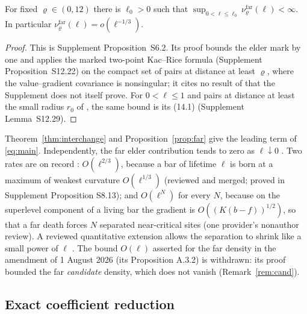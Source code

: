 \begin{proposition}\label{prop:far}
For fixed $\varrho\in(0,12)$ there is $\ell_0>0$ such that $\sup_{0<\ell\le\ell_0}\nu^{\mathrm{far}}_\varrho(\ell)<\infty$. In particular $\nu^{\mathrm{far}}_\varrho(\ell)=o(\ell^{-1/3})$.
\end{proposition}

\begin{proof}
This is Supplement Proposition~S6.2. Its proof bounds the elder mark by one and applies the marked two-point Kac--Rice formula (Supplement Proposition~S12.22) on the compact set of pairs at distance at least $\varrho$, where the value--gradient covariance is nonsingular; it cites no result of  that the Supplement does not itself prove. For $0<\ell\le1$ and pairs at distance at least the small radius $r_0$ of , the same bound is its (14.1) (Supplement Lemma~S12.29).
\end{proof}

Theorem~\ref{thm:interchange} and Proposition~\ref{prop:far} give the leading term of \eqref{eq:main}. Independently, the far elder contribution tends to zero as $\ell\downarrow0$ . Two rates are on record : $O(\ell^{2/3})$, because a bar of lifetime $\ell$ is born at a maximum of weakest curvature $O(\ell^{1/3})$ (reviewed and merged; proved in Supplement Proposition S8.13); and $O(\ell^N)$ for every $N$, because on the superlevel component of a living bar the gradient is $O((K(b-f))^{1/2})$, so that a far death forces $N$ separated near-critical sites (one provider's nonauthor review). A reviewed quantitative extension allows the separation to shrink like a small power of $\ell$ . The bound $O(\ell)$ asserted for the far density in the amendment of 1 August 2026 (its Proposition A.3.2) is withdrawn: its proof bounded the far \emph{candidate} density, which does not vanish (Remark~\ref{rem:cand}).

\subsection{Exact coefficient reduction}\label{ssec:coefficient}

